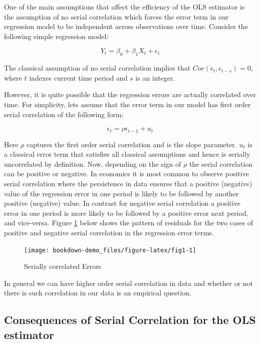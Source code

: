 \documentclass[
]{book}
\theoremstyle{definition}
\theoremstyle{definition}
\theoremstyle{definition}
\theoremstyle{definition}
\theoremstyle{remark}
\begin{document}
One of the main assumptions that affect the efficiency of the OLS estimator is the assumption of no serial correlation which forces the error term in our regression model to be independent across observations over time. Consider the following simple regression model:

\[Y_t=\beta_0 + \beta_1 X_t + \epsilon_t\]

The classical assumption of no serial correlation implies that \(Cor(\epsilon_t,\epsilon_{t-s})=0\), where \(t\) indexes current time period and \(s\) is an integer.

However, it is quite possible that the regression errors are actually correlated over time. For simplicity, lets assume that the error term in our model has first order serial correlation of the following form:

\[\epsilon_t = \rho \epsilon_{t-1} + u_t\]

Here \(\rho\) captures the first order serial correlation and is the slope parameter. \(u_t\) is a classical error term that satisfies all classical assumptions and hence is serially uncorrelated by definition. Now, depending on the sign of \(\rho\) the serial correlation can be positive or negative. In economics it is most common to observe positive serial correlation where the persistence in data ensures that a positive (negative) value of the regression error in one period is likely to be followed by another positive (negative) value. In contrast for negative serial correlation a positive error in one period is more likely to be followed by a positive error next period, and vice-versa. Figure \ref{fig:fig1} below shows the pattern of residuals for the two cases of positive and negative serial correlation in the regression error terms.

\begin{figure}

{\centering \texttt{[image: bookdown-demo\_files/figure-latex/fig1-1]} 

}

\caption{Serially correlated Errors}\label{fig:fig1}
\end{figure}

In general we can have higher order serial correlation in data and whether or not there is such correlation in our data is an empirical question.

\hypertarget{consequences-of-serial-correlation-for-the-ols-estimator}{%
\subsection{Consequences of Serial Correlation for the OLS estimator}\label{consequences-of-serial-correlation-for-the-ols-estimator}}
\end{document}
